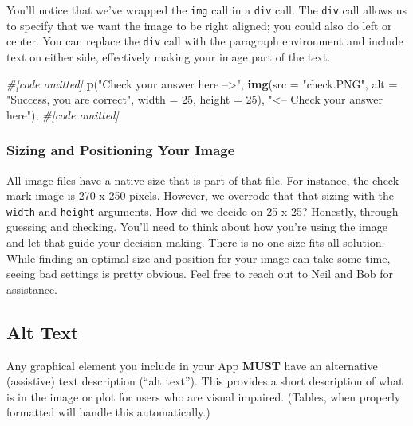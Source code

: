 \documentclass[
]{book}
\newenvironment{Shaded}{\begin{snugshade}}{\end{snugshade}}
\newcommand{\CommentTok}[1]{\textcolor[rgb]{0.56,0.35,0.01}{\textit{#1}}}
\newcommand{\DataTypeTok}[1]{\textcolor[rgb]{0.13,0.29,0.53}{#1}}
\newcommand{\DecValTok}[1]{\textcolor[rgb]{0.00,0.00,0.81}{#1}}
\newcommand{\KeywordTok}[1]{\textcolor[rgb]{0.13,0.29,0.53}{\textbf{#1}}}
\newcommand{\NormalTok}[1]{#1}
\newcommand{\StringTok}[1]{\textcolor[rgb]{0.31,0.60,0.02}{#1}}
\begin{document}
You'll notice that we've wrapped the \texttt{img} call in a \texttt{div} call. The \texttt{div} call allows us to specify that we want the image to be right aligned; you could also do left or center. You can replace the \texttt{div} call with the paragraph environment and include text on either side, effectively making your image part of the text.

\begin{Shaded}
\begin{Highlighting}[]
\CommentTok{#[code omitted]}
\KeywordTok{p}\NormalTok{(}\StringTok{"Check your answer here -->"}\NormalTok{,}
  \KeywordTok{img}\NormalTok{(}\DataTypeTok{src =} \StringTok{"check.PNG"}\NormalTok{,}
      \DataTypeTok{alt =} \StringTok{"Success, you are correct"}\NormalTok{,}
      \DataTypeTok{width =} \DecValTok{25}\NormalTok{, }\DataTypeTok{height =} \DecValTok{25}\NormalTok{),}
  \StringTok{"<-- Check your answer here"}\NormalTok{),}
\CommentTok{#[code omitted]}
\end{Highlighting}
\end{Shaded}

\hypertarget{sizing-and-positioning-your-image}{%
\subsubsection{Sizing and Positioning Your Image}\label{sizing-and-positioning-your-image}}

All image files have a native size that is part of that file. For instance, the check mark image is 270 x 250 pixels. However, we overrode that that sizing with the \texttt{width} and \texttt{height} arguments. How did we decide on 25 x 25? Honestly, through guessing and checking. You'll need to think about how you're using the image and let that guide your decision making. There is no one size fits all solution. While finding an optimal size and position for your image can take some time, seeing bad settings is pretty obvious. Feel free to reach out to Neil and Bob for assistance.

\hypertarget{altText}{%
\subsection{Alt Text}\label{altText}}

Any graphical element you include in your App \textbf{MUST} have an alternative (assistive) text description (``alt text''). This provides a short description of what is in the image or plot for users who are visual impaired. (Tables, when properly formatted will handle this automatically.)
\end{document}
